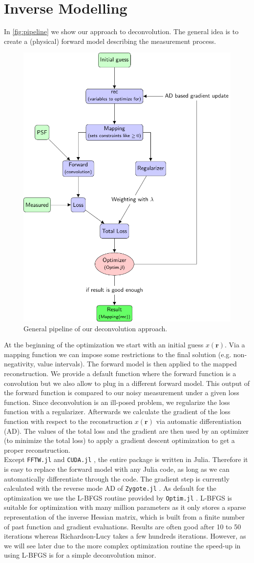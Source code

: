 \documentclass{juliacon}
\begin{document}
\section{Inverse Modelling}
In \autoref{fig:pipeline} we show our approach to deconvolution.
The general idea is to create a (physical) forward model describing the measurement process.
\begin{figure}[h]
    \centering
    \includegraphics[width = .4\textwidth]{figures/pipeline.pdf}
    \caption{General pipeline of our deconvolution approach.}
    \label{fig:pipeline}
\end{figure}

At the beginning of the optimization we start with an initial guess $x(\mathbf r)$. 
Via a mapping function we can impose some restrictions to the final solution (e.g. non-negativity, value intervals).
The forward model is then applied to the mapped reconstruction. We provide a default function where 
the forward function is a convolution but we also allow to plug in a different forward model.
This output of the forward function is compared
to our noisy measurement under a given loss function.
Since deconvolution is an ill-posed problem, we regularize the loss function with a regularizer.
Afterwards we calculate the gradient of the loss function with respect to the reconstruction $x(\mathbf r)$ via automatic differentiation (AD).
The values of the total loss and the gradient are then used by an optimizer (to minimize the total loss) to apply a gradient descent optimization to get a proper reconstruction.\\

Except \verb|FFTW.jl| and \verb|CUDA.jl| \cite{besard2018juliagpu}, the entire package is written in Julia.
Therefore it is easy to replace the forward model with any Julia code, as long as we can 
automatically differentiate through the code. The gradient step is currently calculated with the reverse mode AD of \verb|Zygote.jl| \cite{Zygote.jl-2018}. 
As default for the optimization we use the L-BFGS \cite{LBFGS} routine provided by \verb|Optim.jl| \cite{mogensen2018optim}.
L-BFGS is suitable for optimization with many million parameters as it only stores a sparse representation of the inverse Hessian matrix,
which is built from a finite number of past function and gradient evaluations. 
Results are often good after 10 to 50 iterations whereas Richardson-Lucy takes
a few hundreds iterations. 
However, as we will see later due to the more complex optimization routine the speed-up in using L-BFGS is for a simple 
deconvolution minor.
\end{document}
